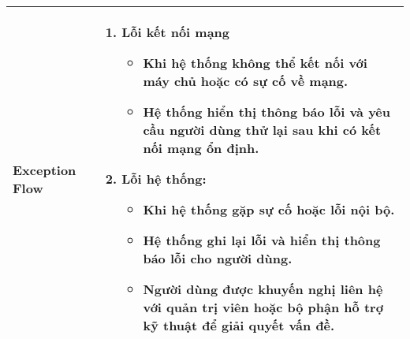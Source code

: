 \begin{longtable}[H]{|l|p{}|}
        \textbf{Exception Flow} & \vspace{-0.75cm} \begin{enumerate}[leftmargin=5.5mm]
            \item Lỗi kết nối mạng
                \begin{itemize}[topsep=0pt]
                    \setlength\itemsep{0em}
                    \item Khi hệ thống không thể kết nối với máy chủ hoặc có sự cố về mạng.
                    \item Hệ thống hiển thị thông báo lỗi và yêu cầu người dùng thử lại sau khi có kết nối mạng ổn định.
                \end{itemize}
            \item Lỗi hệ thống:
                \begin{itemize}[topsep=0pt]
                    \setlength\itemsep{0em}
                    \item Khi hệ thống gặp sự cố hoặc lỗi nội bộ.
                    \item Hệ thống ghi lại lỗi và hiển thị thông báo lỗi cho người dùng.
                    \item Người dùng được khuyến nghị liên hệ với quản trị viên hoặc bộ phận hỗ trợ kỹ thuật để giải quyết vấn đề.
                \end{itemize}
        \end{enumerate}\\
        \hline 
    \end{longtable}
    

